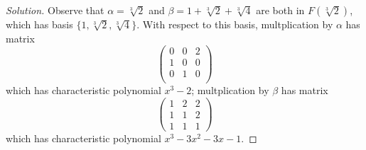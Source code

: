 \documentclass[10pt]{article}
\newenvironment{soln}{\begin{proof}[Solution]}{\end{proof}}
\begin{document}
\begin{soln}
    Observe that $\alpha = \sqrt[3]2$ and $\beta = 1 + \sqrt[3]2 + \sqrt[3]4$
    are both in $F(\sqrt[3]2)$, which has basis
    $\{1,\sqrt[3]2,\sqrt[3]4\}$. With respect to this basis,
    multplication by $\alpha$ has matrix
    \begin{equation*}
        \begin{pmatrix}
	    0 & 0 & 2\\
	    1 & 0 & 0\\
	    0 & 1 & 0\\
        \end{pmatrix}
    \end{equation*}
    which has characteristic polynomial $\boxed{x^3 - 2}$;
    multplication by $\beta$ has matrix
    \begin{equation*}
        \begin{pmatrix}
	    1 & 2 & 2\\
	    1 & 1 & 2\\
	    1 & 1 & 1
        \end{pmatrix}
    \end{equation*}
    which has characteristic polynomial
    $\boxed{x^3 - 3x^2 - 3x - 1}$.
\end{soln}
\end{document}
